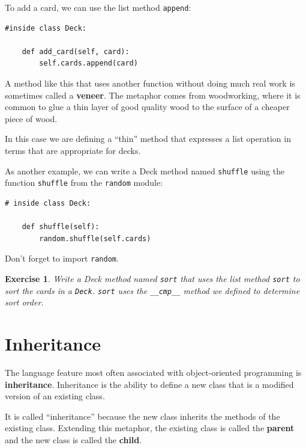 \documentclass[12pt,a4paper,final,twoside,onecolumn,titlepage]{book}
\newtheorem{exercise}{Exercise}[chapter]
\begin{document}
To add a card, we can use the list method {\tt append}:

\begin{verbatim}
#inside class Deck:

    def add_card(self, card):
        self.cards.append(card)
\end{verbatim}
%
A method like this that uses another function without doing
much real work is sometimes called a {\bf veneer}.  The metaphor
comes from woodworking, where it is common to glue a thin
layer of good quality wood to the surface of a cheaper piece of
wood.

In this case we are defining a ``thin'' method that expresses
a list operation in terms that are appropriate for decks.

As another example, we can write a Deck method named {\tt shuffle}
using the function {\tt shuffle} from the {\tt random} module:

\begin{verbatim}
# inside class Deck:
            
    def shuffle(self):
        random.shuffle(self.cards)
\end{verbatim}
%
Don't forget to import {\tt random}.

\begin{exercise}

Write a Deck method named {\tt sort} that uses the list method
{\tt sort} to sort the cards in a {\tt Deck}.  {\tt sort} uses
the \verb"__cmp__" method we defined to determine sort order.
\end{exercise}



\section{Inheritance}

The language feature most often associated with object-oriented
programming is {\bf inheritance}.  Inheritance is the ability to
define a new class that is a modified version of an existing
class.

It is called ``inheritance'' because the new class inherits the
methods of the existing class.  Extending this metaphor, the existing
class is called the {\bf parent} and the new class is
called the {\bf child}.
\end{document}
